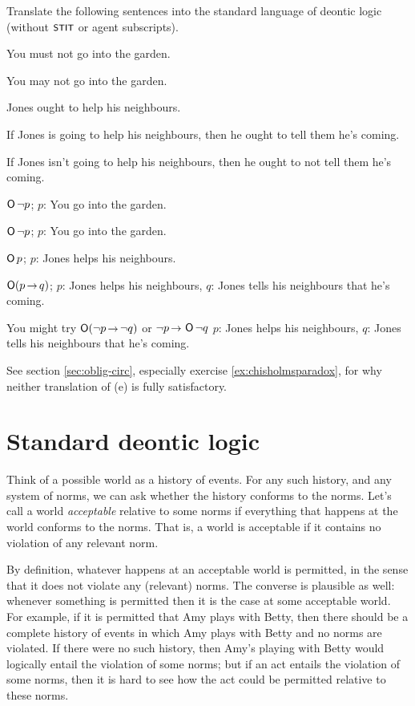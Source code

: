 \begin{exercise}\label{ex:translate-sdl}
  Translate the following sentences into the standard language of deontic logic (without $\stit$ or agent subscripts).
  \begin{exlist}
  \item You must not go into the garden.
  \item You may not go into the garden.
  \item Jones ought to help his neighbours.
  \item If Jones is going to help his neighbours, then he ought to tell them
    he's coming.
  \item If Jones isn't going to help his neighbours, then he ought to not tell
    them he's coming.
  \end{exlist}
\end{exercise}
\begin{solution}
  \begin{sollist}
    \item $\operatorname{\mathsf{O}} \neg p$; \quad $p$: You go into the garden.
    \item $\operatorname{\mathsf{O}} \neg p$; \quad $p$: You go into the garden.
    \item $\operatorname{\mathsf{O}} p$; \quad $p$: Jones helps his neighbours.
    \item $\Ob (p \to q)$; \quad $p$: Jones helps his
    neighbours, $q$: Jones tells his neighbours that he's coming.
    \item You might try $\Ob (\neg p \to \neg q)$ or $\neg p \to \Ob \neg q$ \quad $p$: Jones helps his neighbours, $q$: Jones tells his neighbours that he's coming.
  \end{sollist}
  See section \ref{sec:oblig-circ}, especially exercise \ref{ex:chisholmsparadox},
  for why neither translation of (e) is fully satisfactory.
\end{solution}


\section{Standard deontic logic}

Think of a possible world as a history of events. For any such history, and any
system of norms, we can ask whether the history conforms to the norms. Let's
call a world \emph{acceptable} relative to some norms if everything that happens
at the world conforms to the norms. That is, a world is acceptable if it
contains no violation of any relevant norm.

By definition, whatever happens at an acceptable world is permitted, in the
sense that it does not violate any (relevant) norms. The converse is plausible
as well: whenever something is permitted then it is the case at some acceptable
world. For example, if it is permitted that Amy plays with Betty, then there
should be a complete history of events in which Amy plays with Betty and no
norms are violated. If there were no such history, then Amy's playing with Betty
would logically entail the violation of some norms; but if an act entails the
violation of some norms, then it is hard to see how the act could be permitted
relative to these norms.

